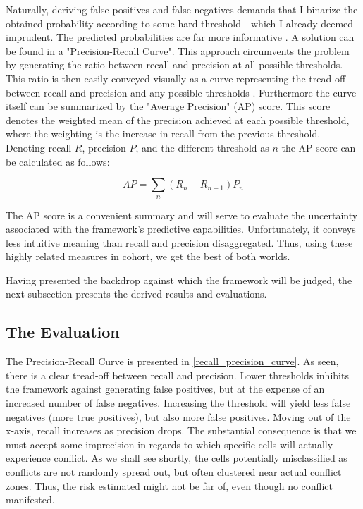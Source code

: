 \documentclass[a4paper]{article}
\begin{document}
Naturally, deriving false positives and false negatives demands that I binarize the obtained probability according to some hard threshold - which I already deemed imprudent. The predicted probabilities are far more informative \cite{Goldstone_2010}. A solution can be found in a "Precision-Recall Curve". This approach circumvents the problem by generating the ratio between recall and precision at all possible thresholds. This ratio is then easily conveyed visually as a curve representing the tread-off between recall and precision and any possible thresholds \cite[1278]{He_2008}. Furthermore the curve itself can be summarized by the "Average Precision" (AP) score. This score denotes the weighted mean of the precision achieved at each possible threshold, where the weighting is the increase in recall from the previous threshold. Denoting recall $R$, precision $P$, and the different threshold as $n$ the AP score can be calculated as follows:\par

\[
AP = \sum_n (R_n-R_{n-1})P_n \tag{4} \label{eq:ap}
\]

The AP score is a convenient summary and will serve to evaluate the uncertainty associated with the framework's predictive capabilities. Unfortunately, it conveys less intuitive meaning than recall and precision disaggregated. Thus, using these highly related measures in cohort, we get the best of both worlds.\par

Having presented the backdrop against which the framework will be judged, the next subsection presents the derived results and evaluations.\par

\subsection{The Evaluation}

The Precision-Recall Curve is presented in \autoref{recall_precision_curve}. As seen, there is a clear tread-off between recall and precision. Lower thresholds inhibits the framework against generating false positives, but at the expense of an increased number of false negatives. Increasing the threshold will yield less false negatives (more true positives), but also more false positives. Moving out of the x-axis, recall increases as precision drops. The substantial consequence is that we must accept some imprecision in regards to which specific cells will actually experience conflict. As we shall see shortly, the cells potentially misclassified as conflicts are not randomly spread out, but often clustered near actual conflict zones. Thus, the risk estimated might not be far of, even though no conflict manifested.\par
\end{document}
